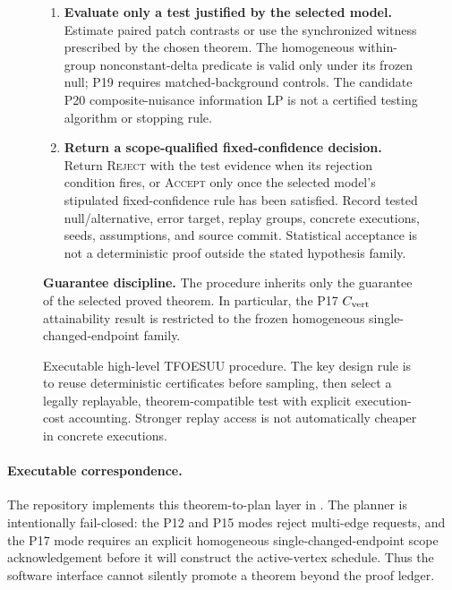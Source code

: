 \begin{figure}[t]
{\begin{minipage}{0.93\textwidth}
\begin{enumerate}[leftmargin=1.6em,itemsep=2pt,topsep=3pt]
\item \textbf{Evaluate only a test justified by the selected model.}
Estimate paired patch contrasts or use the synchronized witness prescribed by
the chosen theorem. The homogeneous within-group nonconstant-delta predicate
is valid only under its frozen null; P19 requires matched-background controls.
The candidate P20 composite-nuisance information LP is not a certified
testing algorithm or stopping rule.

\item \textbf{Return a scope-qualified fixed-confidence decision.}
Return \textsc{Reject} with the test evidence when its rejection condition
fires, or \textsc{Accept} only once the selected model's stipulated
fixed-confidence rule has been satisfied. Record tested null/alternative,
error target, replay groups, concrete executions, seeds, assumptions, and
source commit. Statistical acceptance is not a deterministic proof outside
the stated hypothesis family.
\end{enumerate}

\textbf{Guarantee discipline.}  The procedure inherits only the guarantee of
the selected proved theorem.  In particular, the P17 $C_{\rm vert}$
attainability result is restricted to the frozen homogeneous
single-changed-endpoint family.
\end{minipage}}
\caption{Executable high-level TFOESUU procedure.  The key design rule is to reuse deterministic certificates before sampling,
then select a legally replayable, theorem-compatible test with explicit
execution-cost accounting. Stronger replay access is not automatically cheaper
in concrete executions.}
\label{alg:tfoesuu}
\end{figure}
\paragraph{Executable correspondence.}
The repository implements this theorem-to-plan layer in
.  The planner is intentionally fail-closed:
the P12 and P15 modes reject multi-edge requests, and the P17 mode requires an
explicit homogeneous single-changed-endpoint scope acknowledgement before it
will construct the active-vertex schedule.  Thus the software interface cannot
silently promote a theorem beyond the proof ledger.

